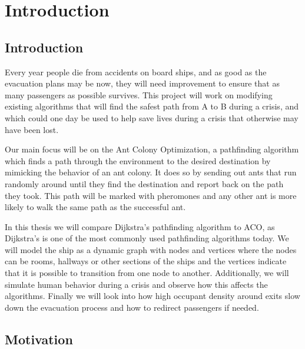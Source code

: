 \chapter{Introduction}
\label{ch:introduction}

\section{Introduction}

Every year people die from accidents on board ships, and as good as the evacuation plans may be now, 
they will need improvement to ensure that as many passengers as possible survives. This project will work
 on modifying existing algorithms that will find the safest path from A to B during a crisis, and which could
 one day be used to help save lives during a crisis that otherwise may have been lost. 

Our main focus will be on the Ant Colony Optimization, a pathfinding algorithm which finds a path through
 the environment to the desired destination by mimicking the behavior of an ant colony. It does so by sending 
out ants that run randomly around until they find the destination and report back on the path they took.
 This path will be marked with pheromones and any other ant is more likely to walk the same path as the successful ant. 

In this thesis we will compare Dijkstra's pathfinding algorithm to ACO, as Dijkstra's is one of the most commonly
 used pathfinding algorithms today. We will model the ship as a dynamic graph with nodes and vertices where
 the nodes can be rooms, hallways or other sections of the ships and the vertices indicate that it is possible to
 transition from one node to another. Additionally, we will simulate human behavior during a crisis and observe
 how this affects the algorithms. Finally we will look into how high occupant density around exits slow down the 
evacuation process and how to redirect passengers if needed.

\section{Motivation}

